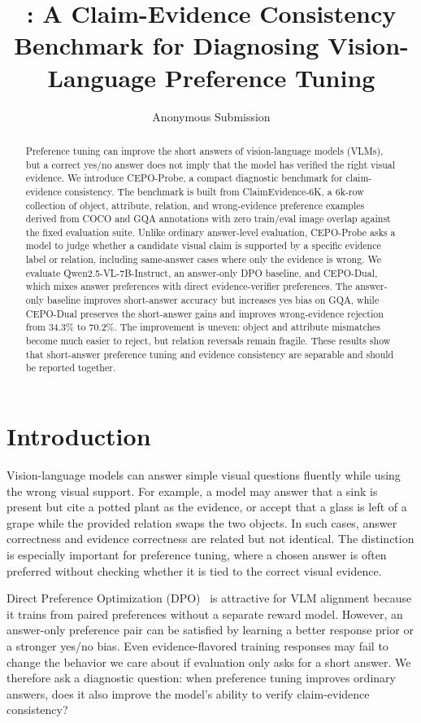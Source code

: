 \documentclass[10pt,twocolumn,letterpaper]{article}
\title{\benchmark{}: A Claim-Evidence Consistency Benchmark for Diagnosing Vision-Language Preference Tuning}
\author{Anonymous \confName{} Submission}
\newcommand{\benchmark}{CEPO-Probe}
\newcommand{\dataset}{ClaimEvidence-6K}
\newcommand{\cepodual}{CEPO-Dual}
\begin{document}
\maketitle

\begin{abstract}
Preference tuning can improve the short answers of vision-language models
(VLMs), but a correct yes/no answer does not imply that the model has verified
the right visual evidence. We introduce \benchmark{}, a compact diagnostic
benchmark for claim-evidence consistency. The benchmark is built from
\dataset{}, a 6k-row collection of object, attribute, relation, and
wrong-evidence preference examples derived from COCO and GQA annotations with
zero train/eval image overlap against the fixed evaluation suite. Unlike
ordinary answer-level evaluation, \benchmark{} asks a model to judge whether a
candidate visual claim is supported by a specific evidence label or relation,
including same-answer cases where only the evidence is wrong. We evaluate
Qwen2.5-VL-7B-Instruct, an answer-only DPO baseline, and \cepodual{}, which
mixes answer preferences with direct evidence-verifier preferences. The
answer-only baseline improves short-answer accuracy but increases yes bias on
GQA, while \cepodual{} preserves the short-answer gains and improves
wrong-evidence rejection from 34.3\% to 70.2\%. The improvement is uneven:
object and attribute mismatches become much easier to reject, but relation
reversals remain fragile. These results show that short-answer preference
tuning and evidence consistency are separable and should be reported together.
\end{abstract}

\section{Introduction}

Vision-language models can answer simple visual questions fluently while using
the wrong visual support. For example, a model may answer that a sink is
present but cite a potted plant as the evidence, or accept that a glass is left
of a grape while the provided relation swaps the two objects. In such cases,
answer correctness and evidence correctness are related but not identical. The
distinction is especially important for preference tuning, where a chosen
answer is often preferred without checking whether it is tied to the correct
visual evidence.

Direct Preference Optimization (DPO)~\cite{dpo} is attractive for VLM
alignment because it trains from paired preferences without a separate reward
model. However, an answer-only preference pair can be satisfied by learning a
better response prior or a stronger yes/no bias. Even evidence-flavored
training responses may fail to change the behavior we care about if evaluation
only asks for a short answer. We therefore ask a diagnostic question: when
preference tuning improves ordinary answers, does it also improve the model's
ability to verify claim-evidence consistency?
\end{document}
